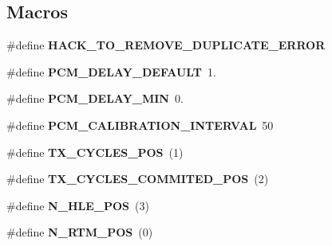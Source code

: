 \subsection*{Macros}
\begin{DoxyCompactItemize}
\item 
\mbox{\label{pcm-tsx_8cpp_ac4eeb11d89b0f517835a12a04443ebe4}} 
\#define {\bfseries H\+A\+C\+K\+\_\+\+T\+O\+\_\+\+R\+E\+M\+O\+V\+E\+\_\+\+D\+U\+P\+L\+I\+C\+A\+T\+E\+\_\+\+E\+R\+R\+OR}
\item 
\mbox{\label{pcm-tsx_8cpp_aa9ecc55c90c7a69729babc4f5f91ed96}} 
\#define {\bfseries P\+C\+M\+\_\+\+D\+E\+L\+A\+Y\+\_\+\+D\+E\+F\+A\+U\+LT}~1.
\item 
\mbox{\label{pcm-tsx_8cpp_acccbe8441d6dd75bdc949f5f0ee126c5}} 
\#define {\bfseries P\+C\+M\+\_\+\+D\+E\+L\+A\+Y\+\_\+\+M\+IN}~0.
\item 
\mbox{\label{pcm-tsx_8cpp_a433dde946b6713059756318598c9a6fe}} 
\#define {\bfseries P\+C\+M\+\_\+\+C\+A\+L\+I\+B\+R\+A\+T\+I\+O\+N\+\_\+\+I\+N\+T\+E\+R\+V\+AL}~50
\item 
\mbox{\label{pcm-tsx_8cpp_addbd44927f4db32cabe5120a93739d9b}} 
\#define {\bfseries T\+X\+\_\+\+C\+Y\+C\+L\+E\+S\+\_\+\+P\+OS}~(1)
\item 
\mbox{\label{pcm-tsx_8cpp_a6013ef04cedfcf54d163fae819cefbd1}} 
\#define {\bfseries T\+X\+\_\+\+C\+Y\+C\+L\+E\+S\+\_\+\+C\+O\+M\+M\+I\+T\+E\+D\+\_\+\+P\+OS}~(2)
\item 
\mbox{\label{pcm-tsx_8cpp_ae781e339bd97f8539c4c52a7f8aeb6db}} 
\#define {\bfseries N\+\_\+\+H\+L\+E\+\_\+\+P\+OS}~(3)
\item 
\mbox{\label{pcm-tsx_8cpp_a7b2ca9f81e64b26449fefab2789a257c}} 
\#define {\bfseries N\+\_\+\+R\+T\+M\+\_\+\+P\+OS}~(0)
\end{DoxyCompactItemize}
